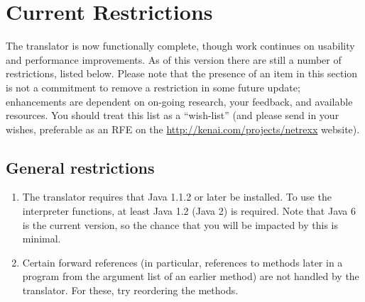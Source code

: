 \chapter{Current Restrictions}\label{restrictions}
The \nr{} translator is now functionally complete, though work continues on usability and performance improvements. As of this version there are still a number of restrictions, listed below. 
Please note that the presence of an item in this section is not a commitment to remove a restriction in some future update; \nr{} enhancements are dependent on on-going research, your feedback, and available resources. You should treat this list as a “wish-list” (and please send in your wishes, preferable as an RFE on the \url{http://kenai.com/projects/netrexx} website). 
\section{General restrictions}
\begin{enumerate}
\item The translator requires that Java 1.1.2 or later be installed. To use the interpreter functions, at least Java 1.2 (Java 2) is required. Note that Java 6 is the current version, so the chance that you will be impacted by this is minimal. 
\item Certain forward references (in particular, references to methods later in a program from the argument list of an earlier method) are not handled by the translator. For these, try reordering the methods.
\end{enumerate}

